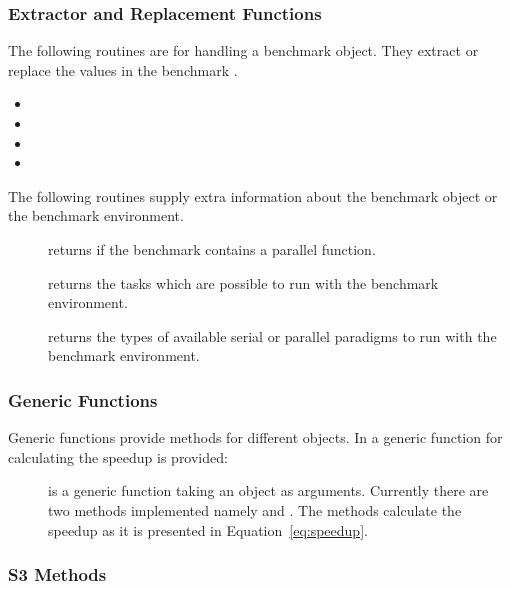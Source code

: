 \begin{Example}
\subsubsection{Extractor and Replacement Functions}

The following routines are for handling a benchmark object. They
extract or replace the values in the benchmark .

\begin{itemize}
\item {}
\item {}
\item {}
\item {}
\end{itemize}

The following routines supply extra information about the benchmark object
or the benchmark environment.

\begin{description}
\item[] returns  if the benchmark
  contains a parallel function. 
\item[] returns the tasks which are possible to run
  with the benchmark environment.
\item[] returns the types of available serial or
  parallel paradigms to run with the benchmark environment.
\end{description}

\subsubsection{Generic Functions}

Generic functions provide methods for different objects. In 
a generic function for calculating the speedup is provided:

\begin{description}
\item[] is a generic function taking an object as
  arguments. Currently there are two methods implemented namely
   and . The methods
  calculate the speedup as it is presented in
  Equation~\ref{eq:speedup}.
\end{description}

\subsubsection{S3 Methods}


\end{Example}
